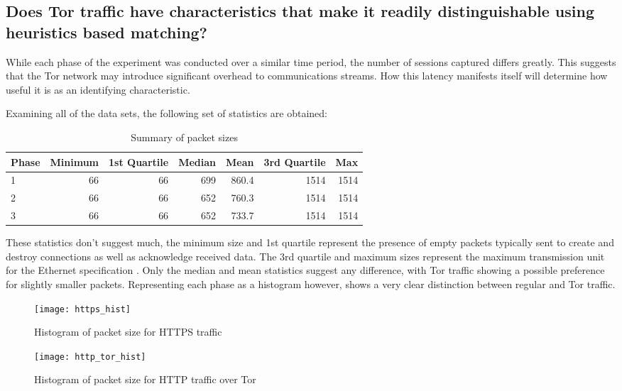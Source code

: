 \subsection{Does Tor traffic have characteristics that make it readily
distinguishable using heuristics based matching?}

While each phase of the experiment was conducted over a similar time
period, the number of sessions captured differs greatly. This suggests that
the Tor network may introduce significant overhead to communications
streams. How this latency manifests itself will determine how useful it is
as an identifying characteristic.

Examining all of the data sets, the following set of statistics are obtained:

\begin{table}[H]
  \begin{tabular}{lrrrrrr}
    \toprule
    Phase & Minimum & 1st Quartile & Median & Mean & 3rd Quartile & Max \\
    \midrule
    1 & 66 & 66 & 699 & 860.4 & 1514 & 1514\\
    2 & 66 & 66 & 652 & 760.3 & 1514 & 1514\\
    3 & 66 & 66 & 652 & 733.7 & 1514 & 1514\\
    \bottomrule
  \end{tabular}
  \caption{Summary of packet sizes}
  \label{table:packet_size_statistics}
\end{table}

These statistics don't suggest much, the minimum size and 1st quartile
represent the presence of empty packets typically sent to create and destroy
connections as well as acknowledge received data. The 3rd quartile and maximum
sizes represent the maximum transmission unit for the Ethernet specification
\parencite{Postel:1988fk}. Only the median and mean statistics suggest any
difference, with Tor traffic showing a possible preference for slightly smaller
packets.  Representing each phase as a histogram however, shows a very clear
distinction between regular and Tor traffic.

\begin{figure}[H]
  \centering\texttt{[image: https\_hist]}
  \caption{Histogram of packet size for HTTPS traffic}
  \label{https_hist}
\end{figure}

\begin{figure}[H]
  \centering\texttt{[image: http\_tor\_hist]}
  \caption{Histogram of packet size for HTTP traffic over Tor}
  \label{http_tor_hist}
\end{figure}

